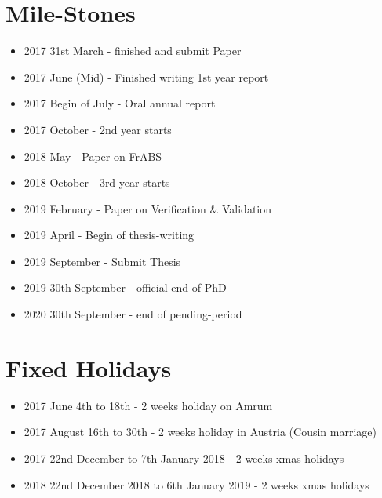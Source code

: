 \section{Mile-Stones}
\begin{itemize}
	\item 2017 31st March - finished and submit Paper 
	\item 2017 June (Mid) - Finished writing 1st year report 
	\item 2017 Begin of July - Oral annual report
	\item 2017 October - 2nd year starts
	\item 2018 May - Paper on FrABS
	\item 2018 October - 3rd year starts
	\item 2019 February - Paper on Verification \& Validation
	\item 2019 April - Begin of thesis-writing
	\item 2019 September - Submit Thesis
	\item 2019 30th September - official end of PhD
	\item 2020 30th September - end of pending-period
\end{itemize}

\section{Fixed Holidays}
\begin{itemize}
	\item 2017 June 4th to 18th - 2 weeks holiday on Amrum 
	\item 2017 August 16th to 30th - 2 weeks holiday in Austria (Cousin marriage)
	\item 2017 22nd December to 7th January 2018 - 2 weeks xmas holidays
	\item 2018 22nd December 2018 to 6th January 2019 - 2 weeks xmas holidays
\end{itemize}